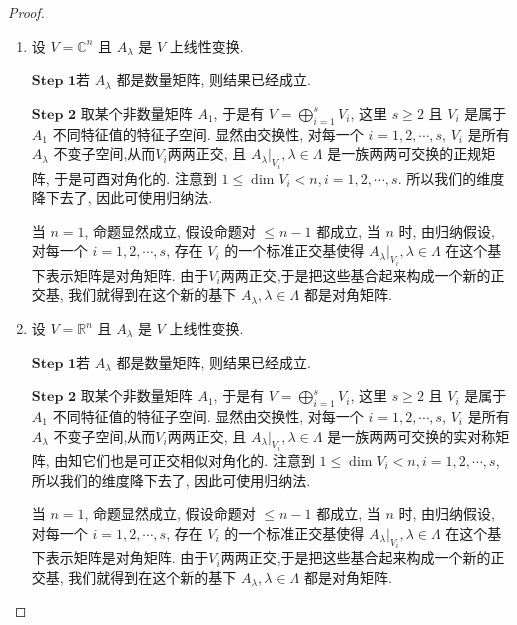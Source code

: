 \documentclass[../../main.tex]{subfiles}%
\begin{document}
\begin{proof}
\begin{enumerate}
\item 设 \(V = \mathbb{C}^n\) 且 \(A_{\lambda}\) 是 \(V\) 上线性变换.

$\mathbf{Step}\,\,\mathbf{1}$若 \(A_{\lambda}\) 都是数量矩阵, 则结果已经成立.

$\mathbf{Step}\,\,\mathbf{2}$ 取某个非数量矩阵 \(A_1\), 于是有 \(V = \bigoplus_{i=1}^s V_i\), 这里 \(s \geqslant 2\) 且 \(V_i\) 是属于 \(A_1\) 不同特征值的特征子空间. 显然由交换性, 对每一个 \(i = 1, 2, \cdots, s\), \(V_i\) 是所有 \(A_{\lambda}\) 不变子空间,从而$V_i$两两正交, 且 \(A_{\lambda}|_{V_i}, \lambda \in \Lambda\) 是一族两两可交换的正规矩阵, 于是可酉对角化的. 注意到 \(1 \leqslant \dim V_i < n, i = 1, 2, \cdots, s\). 所以我们的维度降下去了, 因此可使用归纳法.

当 \(n = 1\), 命题显然成立, 假设命题对 \(\leqslant n - 1\) 都成立, 当 \(n\) 时, 由归纳假设, 对每一个 \(i = 1, 2, \cdots, s\), 存在 \(V_i\) 的一个标准正交基使得 \(A_{\lambda}|_{V_i}, \lambda \in \Lambda\) 在这个基下表示矩阵是对角矩阵. 由于$V_i$两两正交,于是把这些基合起来构成一个新的正交基, 我们就得到在这个新的基下 \(A_{\lambda}, \lambda \in \Lambda\) 都是对角矩阵.

\item 设 \(V = \mathbb{R}^n\) 且 \(A_{\lambda}\) 是 \(V\) 上线性变换.

$\mathbf{Step}\,\,\mathbf{1}$若 \(A_{\lambda}\) 都是数量矩阵, 则结果已经成立.

$\mathbf{Step}\,\,\mathbf{2}$ 取某个非数量矩阵 \(A_1\), 于是有 \(V = \bigoplus_{i=1}^s V_i\), 这里 \(s \geqslant 2\) 且 \(V_i\) 是属于 \(A_1\) 不同特征值的特征子空间. 显然由交换性, 对每一个 \(i = 1, 2, \cdots, s\), \(V_i\) 是所有 \(A_{\lambda}\) 不变子空间,从而$V_i$两两正交, 且 \(A_{\lambda}|_{V_i}, \lambda \in \Lambda\) 是一族两两可交换的实对称矩阵, 由知它们也是可正交相似对角化的. 注意到 \(1 \leqslant \dim V_i < n, i = 1, 2, \cdots, s\), 所以我们的维度降下去了, 因此可使用归纳法.

当 \(n = 1\), 命题显然成立, 假设命题对 \(\leqslant n - 1\) 都成立, 当 \(n\) 时, 由归纳假设, 对每一个 \(i = 1, 2, \cdots, s\), 存在 \(V_i\) 的一个标准正交基使得 \(A_{\lambda}|_{V_i}, \lambda \in \Lambda\) 在这个基下表示矩阵是对角矩阵. 由于$V_i$两两正交,于是把这些基合起来构成一个新的正交基, 我们就得到在这个新的基下 \(A_{\lambda}, \lambda \in \Lambda\) 都是对角矩阵.
\end{enumerate}

\end{proof}
\end{document}
